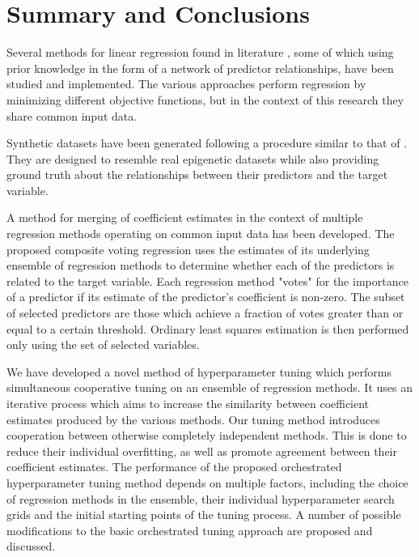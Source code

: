 \chapter{Summary and Conclusions}
Several methods for linear regression found in literature \cite{tibshirani1996regression,zou2005regularization,li2008network,li2010variable,pan2010incorporating,luo2012two,kim2013network}, some of which using prior knowledge in the form of a network of predictor relationships, have been studied and implemented. The various approaches perform regression by minimizing different objective functions, but in the context of this research they share common input data.

Synthetic datasets have been generated following a procedure similar to that of \cite{li2008network}. They are designed to resemble real epigenetic datasets while also providing ground truth about the relationships between their predictors and the target variable.

A method for merging of coefficient estimates in the context of multiple regression methods operating on common input data has been developed. The proposed composite voting regression uses the estimates of its underlying ensemble of regression methods to determine whether each of the predictors is related to the target variable. Each regression method "votes" for the importance of a predictor if its estimate of the predictor's coefficient is non-zero. The subset of selected predictors are those which achieve a fraction of votes greater than or equal to a certain threshold. Ordinary least squares estimation is then performed only using the set of selected variables.

We have developed a novel method of hyperparameter tuning which performs simultaneous cooperative tuning on an ensemble of regression methods. It uses an iterative process which aims to increase the similarity between coefficient estimates produced by the various methods. Our tuning method introduces cooperation between otherwise completely independent methods. This is done to reduce their individual overfitting, as well as promote agreement between their coefficient estimates. The performance of the proposed orchestrated hyperparameter tuning method depends on multiple factors, including the choice of regression methods in the ensemble, their individual hyperparameter search grids and the initial starting points of the tuning process. A number of possible modifications to the basic orchestrated tuning approach are proposed and discussed.

